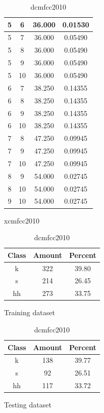 \begin{table}
\begin{subtable}[tbp]{0.45\textwidth}
{\begin{tabular}{|c|c|c|c|}
 5 & 6 & 36.000 & 0.01530\\ \hline 
 5 & 7 & 36.000 & 0.05490\\ \hline 
 5 & 8 & 36.000 & 0.05490\\ \hline 
 5 & 9 & 36.000 & 0.05490\\ \hline 
 5 & 10 & 36.000 & 0.05490\\ \hline 
 6 & 7 & 38.250 & 0.14355\\ \hline 
 6 & 8 & 38.250 & 0.14355\\ \hline 
 6 & 9 & 38.250 & 0.14355\\ \hline 
 6 & 10 & 38.250 & 0.14355\\ \hline 
 7 & 8 & 47.250 & 0.09945\\ \hline 
 7 & 9 & 47.250 & 0.09945\\ \hline 
 7 & 10 & 47.250 & 0.09945\\ \hline 
 8 & 9 & 54.000 & 0.02745\\ \hline 
 8 & 10 & 54.000 & 0.02745\\ \hline 
 9 & 10 & 54.000 & 0.02745\\ \hline 

\end{tabular}
} 
\caption{xcmfcc2010}
\label{xlmfcc2010}
\end{subtable}

\begin{subtable}[tbp]{0.45\textwidth}
\centering
\begin{tabular}{|c|c|c|}
\hline
Class & Amount & Percent\\ \hline
k & 322 & 39.80\\ \hline
s & 214 & 26.45\\ \hline
hh & 273 & 33.75\\ \hline
\end{tabular}
\caption{Training dataset}
\end{subtable}
\hfill
\begin{subtable}[tbp]{0.45\textwidth}
\centering
\begin{tabular}{|c|c|c|}
\hline
Class & Amount & Percent\\ \hline
k & 138 & 39.77\\ \hline
s & 92 & 26.51\\ \hline
hh & 117 & 33.72\\ \hline
\end{tabular}
\caption{Testing dataset}
\end{subtable}
\hfill

\caption{dcmfcc2010}

\label{dlmfcc2010}

\end{table}\clearpage


